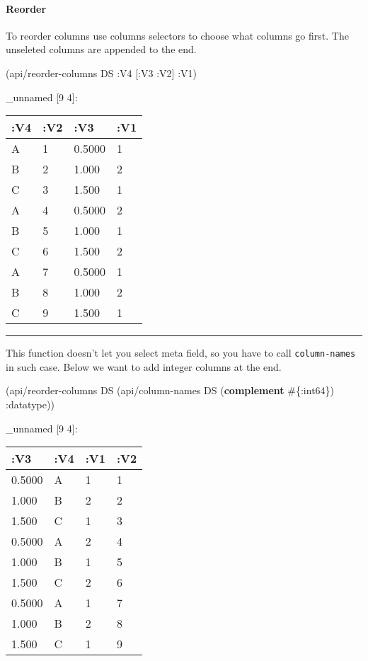 \documentclass[]{article}
\newenvironment{Shaded}{\begin{snugshade}}{\end{snugshade}}
\newcommand{\KeywordTok}[1]{\textcolor[rgb]{0.13,0.29,0.53}{\textbf{#1}}}
\newcommand{\AttributeTok}[1]{\textcolor[rgb]{0.77,0.63,0.00}{#1}}
\newcommand{\NormalTok}[1]{#1}
\let\oldparagraph\paragraph
\renewcommand{\paragraph}[1]{\oldparagraph{#1}\mbox{}}
\begin{document}
\paragraph{Reorder}\label{reorder}

To reorder columns use columns selectors to choose what columns go
first. The unseleted columns are appended to the end.

\begin{Shaded}
\begin{Highlighting}[]
\NormalTok{(api/reorder-columns DS }\AttributeTok{:V4}\NormalTok{ [}\AttributeTok{:V3} \AttributeTok{:V2}\NormalTok{] }\AttributeTok{:V1}\NormalTok{)}
\end{Highlighting}
\end{Shaded}

\_unnamed {[}9 4{]}:

\begin{longtable}[]{@{}llll@{}}
\toprule
:V4 & :V2 & :V3 & :V1\tabularnewline
\midrule
\endhead
A & 1 & 0.5000 & 1\tabularnewline
B & 2 & 1.000 & 2\tabularnewline
C & 3 & 1.500 & 1\tabularnewline
A & 4 & 0.5000 & 2\tabularnewline
B & 5 & 1.000 & 1\tabularnewline
C & 6 & 1.500 & 2\tabularnewline
A & 7 & 0.5000 & 1\tabularnewline
B & 8 & 1.000 & 2\tabularnewline
C & 9 & 1.500 & 1\tabularnewline
\bottomrule
\end{longtable}

\begin{center}\rule{0.5\linewidth}{0.5pt}\end{center}

This function doesn't let you select meta field, so you have to call
\texttt{column-names} in such case. Below we want to add integer columns
at the end.

\begin{Shaded}
\begin{Highlighting}[]
\NormalTok{(api/reorder-columns DS (api/column-names DS (}\KeywordTok{complement}\NormalTok{ #\{}\AttributeTok{:int64}\NormalTok{\}) }\AttributeTok{:datatype}\NormalTok{))}
\end{Highlighting}
\end{Shaded}

\_unnamed {[}9 4{]}:

\begin{longtable}[]{@{}llll@{}}
\toprule
:V3 & :V4 & :V1 & :V2\tabularnewline
\midrule
\endhead
0.5000 & A & 1 & 1\tabularnewline
1.000 & B & 2 & 2\tabularnewline
1.500 & C & 1 & 3\tabularnewline
0.5000 & A & 2 & 4\tabularnewline
1.000 & B & 1 & 5\tabularnewline
1.500 & C & 2 & 6\tabularnewline
0.5000 & A & 1 & 7\tabularnewline
1.000 & B & 2 & 8\tabularnewline
1.500 & C & 1 & 9\tabularnewline
\bottomrule
\end{longtable}
\end{document}
